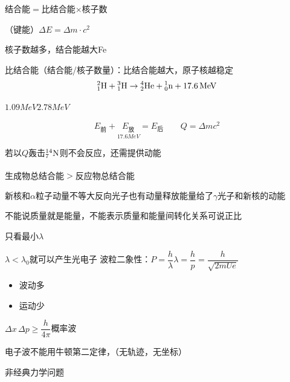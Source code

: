 结合能$=$比结合能$\times$核子数

（键能）\quad $\Delta E=\Delta m\cdot c^2$

核子数越多，结合能越大\quad Fe %

比结合能（结合能/核子数量）：比结合能越大，原子核越稳定
\[
{}^{2}_{1}\mathrm{H}+{}^{3}_{1}\mathrm{H}\to{}^{4}_{2}\mathrm{He}+{}^{1}_{0}\mathrm{n}+17.6\,\mathrm{MeV}
\]


$1.09\unit{MeV}$\quad $2.78\unit{MeV}$ %

\[
E_{\text{前}}+\underset{17.6\unit{MeV}}{E_{\text{放}}}=E_{\text{后}}\qquad Q=\Delta mc^2
\]

若\unclear{$\alpha$}以$Q$轰击${}^{14}_{7}\mathrm{N}$则不会反应，还需提供动能 %

生成物总结合能$>$反应物总结合能\ \textsuperscript{}

新核和$\alpha$粒子动量不等大反向\quad 光子也有动量\quad 释放能量给了$\gamma$光子和新核的动能

不能说质量就是能量，不能表示质量和能量间转化关系\quad 可说正比

只看最小$\lambda$ %

$\lambda<\lambda_0$就可以产生光电子
波粒二象性：$P=\dfrac{h}{\lambda}$\qquad $\lambda=\dfrac{h}{p}=\dfrac{h}{\sqrt{2mUe}}$

\begin{itemize}
\item 波动\quad 多\quad {}
\item 运动\quad 少\quad {}
\end{itemize}

$\Delta x\,\Delta p\ge\dfrac{h}{4\pi}$\quad 概率波

电子波不能用牛顿第二定律，（无轨迹，无坐标）\  %

非经典力学问题\ 
